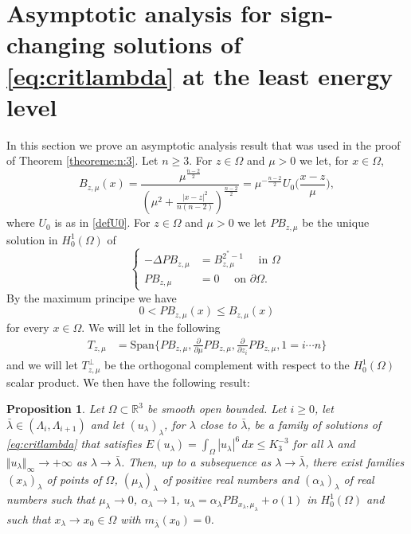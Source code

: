 \documentclass[10pt]{amsart}
\numberwithin{equation}{section}
\newcommand{\R}{\mathbb{R}}
\newcommand{\Om}{\Omega}
\theoremstyle{plain}
\newtheorem{prop}{Proposition}[section]%
\theoremstyle{remark}
\begin{document}
\section{Asymptotic analysis for sign-changing solutions of \eqref{eq:critlambda} at the least energy level} \label{app:m2}

In this section we prove an asymptotic analysis result that was used in the proof of Theorem \ref{theoreme:n:3}. Let $n \ge 3$. For $z \in \Om$ and $\mu >0$ we let, for $x \in \Om$, 
$$ B_{z,\mu}(x) = \frac{\mu^{\frac{n-2}{2}}}{\left( \mu^2 + \frac{|x-z|^2}{n(n-2)} \right)^{\frac{n-2}{2}}} = \mu^{- \frac{n-2}{2}} U_0 \Big( \frac{x-z}{\mu}\Big), $$
where $U_0$ is as in \eqref{defU0}. For $z \in \Om$ and $\mu >0$ we let $P B_{z,\mu}$ be the unique solution in $H^1_0(\Om)$ of 
\begin{equation} \label{projbulle:l}
\left \{ \begin{aligned}
-\Delta P B_{z,\mu}  & = B_{z,\mu}^{2^*-1} \quad \text{ in } \Om \\
P B_{z,\mu} & = 0 \quad \text{ on } \partial \Om.
\end{aligned} \right. 
\end{equation}
By the maximum principe we have 
\begin{equation} \label{projbulle:l:2}
0 < P B_{z,\mu} (x) \le B_{z,\mu}(x)
\end{equation} for every $x \in \Om$. We will let in the following 
\begin{equation} \label{kernels}
\begin{aligned}
  T_{z,\mu} & = \text{Span} \Big \{  P B_{z,\mu}, \frac{\partial}{\partial \mu} P B_{z,\mu},  \frac{\partial}{\partial z_i} P B_{z,\mu} , 1 = i \cdots n\Big \} 
   \end{aligned} 
 \end{equation}
and we will let $T_{z,\mu}^{\perp}$ be the orthogonal complement with respect to the $H^1_0(\Om)$ scalar product. We then have the following result:

\begin{prop} \label{analyse:asympto:onebubble}
Let $\Om \subset \R^3$ be smooth open bounded. Let $i \ge 0$, let $\bar{\lambda} \in (\Lambda_i, \Lambda_{i+1})$ and let $(u_\lambda)_{\lambda}$, for $\lambda$ close to $\bar{\lambda}$, be a family of solutions of \eqref{eq:critlambda} that satisfies $E(u_\lambda) = \int_{\Om} |u_\lambda|^{6}\, dx \le  K_3^{-3}$ for all $\lambda$ and $\Vert u_\lambda \Vert_{\infty} \to + \infty$ as $\lambda \to \bar{\lambda}$. Then, up to a subsequence as $\lambda \to \bar{\lambda}$, there exist families $(x_\lambda)_{\lambda}$ of points of $\Om$, $(\mu_\lambda)_{\lambda}$ of positive real numbers and $(\alpha_\lambda)_{\lambda}$ of real numbers such that $\mu_\lambda \to 0$, $\alpha_\lambda \to 1$, $u_\lambda = \alpha_\lambda PB_{x_\lambda, \mu_\lambda} + o(1)$ in $H^1_0(\Om)$ and such that $x_\lambda \to x_0 \in \Om$ with $m_{\bar{\lambda}}(x_0) = 0$.
\end{prop}
\end{document}
